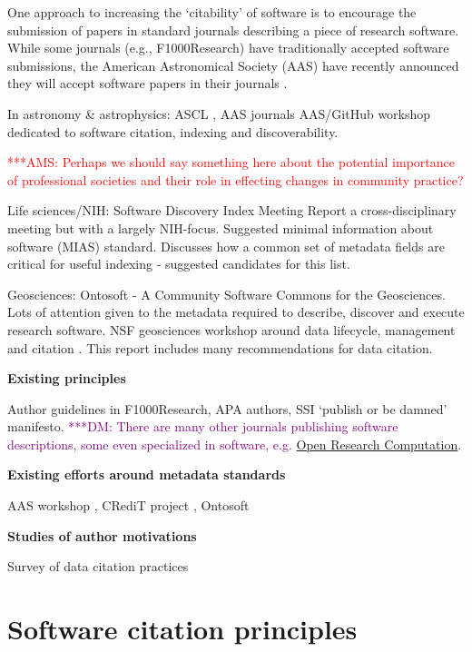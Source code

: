 \documentclass[11pt, oneside]{amsart}
\newcommand{\asnote}[1]{ {\textcolor{red} { ***AMS: #1 }}}
\newcommand{\dmnote}[1]{ {\textcolor{purple} { ***DM: #1 }}} %
\begin{document}
One approach to increasing the `citability' of software is to encourage the
submission of papers in standard journals describing a piece of research
software. While some journals (e.g., F1000Research) have traditionally accepted
software submissions, the American Astronomical Society (AAS) have recently
announced they will accept software papers in their journals
\cite{aas-sofware-papers}.

In astronomy \& astrophysics: ASCL \cite{ascl}, AAS journals  AAS/GitHub
workshop \cite{aas-software-index} dedicated to software citation, indexing and discoverability.

\asnote{Perhaps we should say something here about the potential importance of professional societies and their role in effecting changes in community practice?}

Life sciences/NIH: Software Discovery Index Meeting Report \cite{software-discovery-index} a cross-disciplinary meeting
but with a largely NIH-focus. Suggested minimal information about software (MIAS) standard. Discusses how a common set of metadata
fields are critical for useful indexing - suggested candidates for this list.

Geosciences: Ontosoft \cite{ontosoft} - A Community Software Commons for the Geosciences. Lots of attention given to the metadata
required to describe, discover and execute research software. NSF geosciences workshop around data lifecycle, management and citation \cite{nsf-geo-data}. This report includes many recommendations for data citation.

\textbf{Existing principles}

Author guidelines in F1000Research, APA authors, SSI `publish or be damned' \cite{ssi-publish-or-be-damned} manifesto. \dmnote{There are many other journals publishing software descriptions, some even specialized in software, e.g. \href{http://www.openresearchcomputation.com}{Open Research Computation}.}

\textbf{Existing efforts around metadata standards}

AAS workshop \cite{aas-software-index}, CRediT project \cite{casrai-credit}, Ontosoft \cite{ontosoft}

\textbf{Studies of author motivations}

Survey of data citation practices \cite{Kratz_2015}

\section{Software citation principles}
\label{sec:principles}
\end{document}
